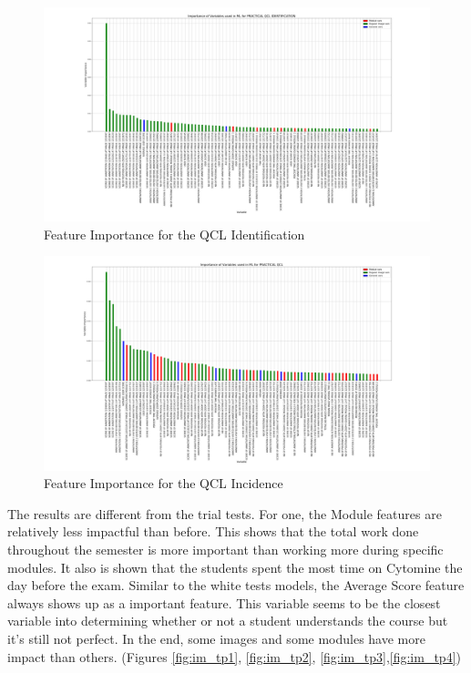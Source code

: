 \documentclass[a4paper,11pt]{report}
\numberwithin{figure}{section} %
\begin{document}
      \begin{figure}[H]
      \centering
      \includegraphics[width=.95\linewidth]{var_importance_PRACTICAL_QCL_IDENTIFICATION_2018-04-29_14_34_11.png}
      \caption{Feature Importance for the QCL Identification}
      \label{fig:var_tp3}
      \end{figure}
      
      \begin{figure}[H]
      \centering
      \includegraphics[width=.95\linewidth]{var_importance_PRACTICAL_QCL_2018-04-29_14_33_44.png}
      \caption{Feature Importance for the QCL Incidence}
      \label{fig:var_tp4}
      \end{figure}

The results are different from the trial tests.
For one, the Module features are relatively less impactful than before.
This shows that the total work done throughout the semester is more important than working more during specific modules.
It also is shown that the students spent the most time on Cytomine the day before the exam.%
Similar to the white tests models, the Average Score feature always shows up as a important feature.
This variable seems to be the closest variable into determining whether or not a student understands the course but it's still not perfect.
In the end, some images and some modules have more impact than others.  (Figures \ref{fig:im_tp1}, \ref{fig:im_tp2}, \ref{fig:im_tp3},\ref{fig:im_tp4})
\end{document}
